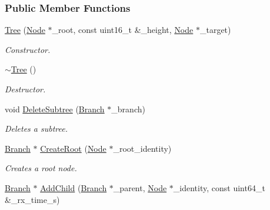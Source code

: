 \subsubsection*{Public Member Functions}
\begin{DoxyCompactItemize}
\item 
\hyperlink{classosse_1_1collaborate_1_1_tree_a5255f4310921f9caa8ba8710e090ac90}{Tree} (\hyperlink{classosse_1_1collaborate_1_1_node}{Node} $\ast$\+\_\+root, const uint16\+\_\+t \&\+\_\+height, \hyperlink{classosse_1_1collaborate_1_1_node}{Node} $\ast$\+\_\+target)
\begin{DoxyCompactList}\small\item\em Constructor. \end{DoxyCompactList}\item 
\mbox{\label{classosse_1_1collaborate_1_1_tree_ac36c59a5b59c87a0681ab5712326d4ff}} 
\hyperlink{classosse_1_1collaborate_1_1_tree_ac36c59a5b59c87a0681ab5712326d4ff}{$\sim$\+Tree} ()
\begin{DoxyCompactList}\small\item\em Destructor. \end{DoxyCompactList}\item 
void \hyperlink{classosse_1_1collaborate_1_1_tree_a04a5fa19a165dd354966e59f48c0c681}{Delete\+Subtree} (\hyperlink{structosse_1_1collaborate_1_1_tree_1_1_branch}{Branch} $\ast$\+\_\+branch)
\begin{DoxyCompactList}\small\item\em Deletes a subtree. \end{DoxyCompactList}\item 
\hyperlink{structosse_1_1collaborate_1_1_tree_1_1_branch}{Branch} $\ast$ \hyperlink{classosse_1_1collaborate_1_1_tree_adfe5d9fa445a38113939f33b61b37a08}{Create\+Root} (\hyperlink{classosse_1_1collaborate_1_1_node}{Node} $\ast$\+\_\+root\+\_\+identity)
\begin{DoxyCompactList}\small\item\em Creates a root node. \end{DoxyCompactList}\item 
\hyperlink{structosse_1_1collaborate_1_1_tree_1_1_branch}{Branch} $\ast$ \hyperlink{classosse_1_1collaborate_1_1_tree_a85ed28c9682af666d94633d9d3b92f04}{Add\+Child} (\hyperlink{structosse_1_1collaborate_1_1_tree_1_1_branch}{Branch} $\ast$\+\_\+parent, \hyperlink{classosse_1_1collaborate_1_1_node}{Node} $\ast$\+\_\+identity, const uint64\+\_\+t \&\+\_\+rx\+\_\+time\+\_\+s)

\end{DoxyCompactItemize}
